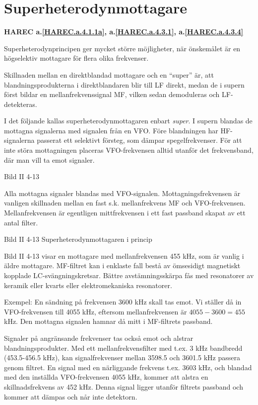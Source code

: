 \section{Superheterodynmottagare}
\textbf{
HAREC a.\ref{HAREC.a.4.1.1a}\label{myHAREC.a.4.1.1a},
 a.\ref{HAREC.a.4.3.1}\label{myHAREC.a.4.3.1},
 a.\ref{HAREC.a.4.3.4}\label{myHAREC.a.4.3.4}
}

Superheterodynprincipen ger mycket större möjligheter, när önskemålet
är en högselektiv mottagare för flera olika frekvenser.

Skillnaden mellan en direktblandad mottagare och en ``super'' är, att
blandningsprodukterna i direktblandaren blir till LF direkt, medan de
i supern först bildar en mellanfrekvenssignal MF, vilken sedan
demoduleras och LF-detekteras.

I det följande kallas superheterodynmottagaren enbart \emph{super}. I
supern blandas de mottagna signalerna med signalen från en VFO. Före
blandningen har HF-signalerna passerat ett selektivt försteg, som
dämpar spegelfrekvenser. För att inte störa mottagningen placeras
VFO-frekvensen alltid utanför det frekvensband, där man vill ta emot
signaler.

Bild II 4-13

Alla mottagna signaler blandas med VFO-signalen. Mottagningsfrekvensen
är vanligen skillnaden mellan en fast s.k. mellanfrekvens MF och
VFO-frekvensen. Mellanfrekvensen är egentligen mittfrekvensen i ett
fast passband skapat av ett antal filter.

Bild II 4-13 Superheterodynmottagaren i princip

Bild II 4-13 visar en mottagare med mellanfrekvensen 455 kHz, som är
vanlig i äldre mottagare. MF-filtret kan i enklaste fall bestå av
ömsesidigt magnetiskt kopplade LC-svängningskretsar. Bättre
avstämningsskärpa fås med resonatorer av keramik eller kvarts eller
elektromekaniska resonatorer.

Exempel: En sändning på frekvensen 3600 kHz skall tas emot. Vi ställer
då in VFO-frekvensen till 4055 kHz, eftersom mellanfrekvensen är
\(4055 - 3600 = 455\) kHz. Den mottagna signalen hamnar då mitt i
MF-filtrets passband.

Signaler på angränsande frekvenser tas också emot och alstrar
blandningsprodukter.  Med ett mellanfrekvensfilter med t.ex. 3 kHz
bandbredd (453.5-456.5 kHz), kan signalfrekvenser mellan 3598.5 och
3601.5 kHz passera genom filtret. En signal med en närliggande
frekvens t.ex. 3603 kHz, och blandad med den inställda VFO-frekvensen
4055 kHz, kommer att alstra en skillnadsfrekvens av 452 kHz. Denna
signal ligger utanför filtrets passband och kommer att dämpas och når
inte detektorn.

